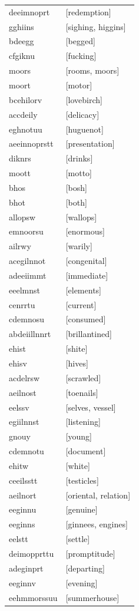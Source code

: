 \documentclass{article}
\begin{document}
\begin{tabular}{ll}
deeimnoprt & [redemption] \\
gghiins & [sighing, higgins] \\
bdeegg & [begged] \\
cfgiknu & [fucking] \\
moors & [rooms, moors] \\
moort & [motor] \\
bcehilorv & [lovebirch] \\
accdeily & [delicacy] \\
eghnotuu & [huguenot] \\
aeeinnoprstt & [presentation] \\
diknrs & [drinks] \\
moott & [motto] \\
bhos & [bosh] \\
bhot & [both] \\
allopsw & [wallops] \\
emnoorsu & [enormous] \\
ailrwy & [warily] \\
acegilnnot & [congenital] \\
adeeiimmt & [immediate] \\
eeelmnst & [elements] \\
cenrrtu & [current] \\
cdemnosu & [consumed] \\
abdeiillnnrt & [brillantined] \\
ehist & [shite] \\
ehisv & [hives] \\
acdelrsw & [scrawled] \\
aeilnost & [toenails] \\
eelssv & [selves, vessel] \\
egiilnnst & [listening] \\
gnouy & [young] \\
cdemnotu & [document] \\
ehitw & [white] \\
ceeilsstt & [testicles] \\
aeilnort & [oriental, relation] \\
eeginnu & [genuine] \\
eeginns & [ginnees, engines] \\
eelstt & [settle] \\
deimopprttu & [promptitude] \\
adeginprt & [departing] \\
eeginnv & [evening] \\
eehmmorssuu & [summerhouse] \\

\end{tabular}
\end{document}
